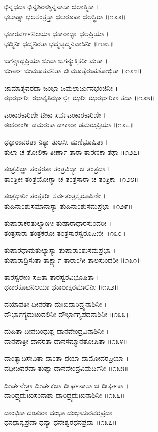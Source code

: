 ಛಿನ್ನಛದಾ ಛಿನ್ನಶಿರಾಶ್ಛಿನ್ನನಾಸಾ ಛಲಾತ್ಮಿಕಾ ।\\
ಛಲಾಢ್ಯಾ ಛಲಸಂತ್ರಸ್ತಾ ಛಲರೂಪಾ ಛಲಸ್ಥಿರಾ ॥೧೨೨॥

ಛಕಾರವರ್ಣನಿಲಯಾ ಛಕಾರಾಢ್ಯಾ ಛಲಪ್ರಿಯಾ ।\\
ಛದ್ಮಿನೀ ಛದ್ಮನಿರತಾ ಛದ್ಮಚ್ಛದ್ಮನಿವಾಸಿನೀ ॥೧೨೩॥

ಜಗನ್ನಾಥಪ್ರಿಯಾ ಜೀವಾ ಜಗನ್ಮುಕ್ತಿಕರೀ ಮತಾ ।\\
ಜೀರ್ಣಾ ಜೀಮೂತವನಿತಾ ಜೀಮೂತೈರುಪಶೋಭಿತಾ ॥೧೨೪॥

ಜಾಮಾತೃವರದಾ ಜಂಭಾ ಜಮಲಾರ್ಜುನಭಂಜಿನೀ ।\\
ಝರ್ಝರೀ ಝಾಕೃತಿರ್ಝಲ್ಲೀ ಝರೀ ಝರ್ಝರಿಕಾ ತಥಾ ॥೧೨೫॥

ಟಂಕಾರಕಾರಿಣೀ ಟೀಕಾ ಸರ್ವಟಂಕಾರಕಾರಿಣೀ ।\\
ಠಂಕರಾಂಗೀ ಡಮರುಕಾ ಡಾಕಾರಾ ಡಮರುಪ್ರಿಯಾ ॥೧೨೬॥

ಢಕ್ಕಾರಾವರತಾ ನಿತ್ಯಾ ತುಲಸೀ ಮಣಿಭೂಷಿತಾ ।\\
ತುಲಾ ಚ ತೋಲಿಕಾ ತೀರ್ಣಾ ತಾರಾ ತಾರಣಿಕಾ ತಥಾ ॥೧೨೭॥

ತಂತ್ರವಿಜ್ಞಾ ತಂತ್ರರತಾ ತಂತ್ರವಿದ್ಯಾ ಚ ತಂತ್ರದಾ ।\\
ತಾಂತ್ರಿಕೀ ತಂತ್ರಯೋಗ್ಯಾ ಚ ತಂತ್ರಸಾರಾ ಚ ತಂತ್ರಿಕಾ ॥೧೨೮॥

ತಂತ್ರಧಾರೀ ತಂತ್ರಕರೀ ಸರ್ವತಂತ್ರಸ್ವರೂಪಿಣೀ ।\\
ತುಹಿನಾಂಶುಸಮಾನಾಸ್ಯಾ ತುಹಿನಾಂಶುಸಮಪ್ರಭಾ ॥೧೨೯॥

ತುಷಾರಾಕರತುಲ್ಯಾಂಗೀ ತುಷಾರಾಧಾರಸುಂದರೀ ।\\
ತಂತ್ರಸಾರಾ ತಂತ್ರಕರೋ ತಂತ್ರಸಾರಸ್ವರೂಪಿಣೀ ॥೧೩೦॥

ತುಷಾರಧಾಮತುಲ್ಯಾಸ್ಯಾ ತುಷಾರಾಂಶುಸಮಪ್ರಭಾ ।\\
ತುಷಾರಾದ್ರಿಸುತಾ ತಾರ್ಕ್ಷ್ಯಾ ತಾರಾಂಗೀ ತಾಲಸುಂದರೀ ॥೧೩೧॥

ತಾರಸ್ವರೇಣ ಸಹಿತಾ ತಾರಸ್ವರವಿಭೂಷಿತಾ ।\\
ಥಕಾರಕೂಟನಿಲಯಾ ಥಕಾರಾಕ್ಷರಮಾಲಿನೀ ॥೧೩೨॥

ದಯಾವತೀ ದೀನರತಾ ದುಃಖದಾರಿದ್ರ್ಯನಾಶಿನೀ ।\\
ದೌರ್ಭಾಗ್ಯದುಃಖದಲಿನೀ ದೌರ್ಭಾಗ್ಯಪದನಾಶಿನೀ ॥೧೩೩॥

ದುಹಿತಾ ದೀನಬಂಧುಶ್ಚ ದಾನವೇಂದ್ರವಿನಾಶಿನೀ ।\\
ದಾನಪಾತ್ರೀ ದಾನರತಾ ದಾನಸಮ್ಮಾನತೋಷಿತಾ ॥೧೩೪॥

ದಾಂತ್ಯಾದಿಸೇವಿತಾ ದಾಂತಾ ದಯಾ ದಾಮೋದರಪ್ರಿಯಾ ।\\
ದಧೀಚಿವರದಾ ತುಷ್ಟಾ ದಾನವೇಂದ್ರವಿಮರ್ದಿನೀ ॥೧೩೫॥

ದೀರ್ಘನೇತ್ರಾ ದೀರ್ಘಕಚಾ ದೀರ್ಘನಾಸಾ ಚ ದೀರ್ಘಿಕಾ ।\\
ದಾರಿದ್ರ್ಯದುಃಖಸಂನಾಶಾ ದಾರಿದ್ರ್ಯದುಃಖನಾಶಿನೀ ॥೧೩೬॥

ದಾಂಭಿಕಾ ದಂತುರಾ ದಂಭಾ ದಂಭಾಸುರವರಪ್ರದಾ ।\\
ಧನಧಾನ್ಯಪ್ರದಾ ಧನ್ಯಾ ಧನೇಶ್ವರಧನಪ್ರದಾ ॥೧೩೭॥

